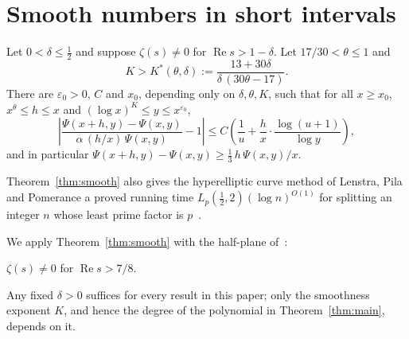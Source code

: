 \section{Smooth numbers in short intervals}\label{sec:smooth}

\begin{theorem}\label{thm:smooth}
Let $0<\delta\le\tfrac12$ and suppose $\zeta(s)\neq0$ for $\operatorname{Re}s>1-\delta$. Let
$17/30<\theta\le1$ and
\[
K>K^*(\theta,\delta):=\frac{13+30\delta}{\delta\,(30\theta-17)} .
\]
There are $\varepsilon_0>0$, $C$ and $x_0$, depending only on $\delta,\theta,K$, such that for all $x\ge x_0$,
$x^\theta\le h\le x$ and $(\log x)^K\le y\le x^{\varepsilon_0}$,
\begin{equation}\label{eq:asym}
\left|\frac{\Psi(x+h,y)-\Psi(x,y)}{\alpha\,(h/x)\,\Psi(x,y)}-1\right|
\le C\left(\frac1u+\frac hx\cdot\frac{\log(u+1)}{\log y}\right),
\end{equation}
and in particular $\Psi(x+h,y)-\Psi(x,y)\ge\tfrac13\,h\,\Psi(x,y)/x$.
\end{theorem}

Theorem~\ref{thm:smooth} also gives the hyperelliptic curve method of Lenstra, Pila and Pomerance a proved
running time $L_p(\tfrac12,2)(\log n)^{O(1)}$ for splitting an integer $n$ whose least prime factor is
$p$~\cite{Comp26b}.

We apply Theorem~\ref{thm:smooth} with the half-plane of~\cite{OAI26}:

\begin{theorem}\label{thm:qrh}
$\zeta(s)\neq0$ for $\operatorname{Re}s>7/8$.
\end{theorem}

Any fixed $\delta>0$ suffices for every result in this paper; only the smoothness exponent $K$, and hence the
degree of the polynomial in Theorem~\ref{thm:main}, depends on it.

